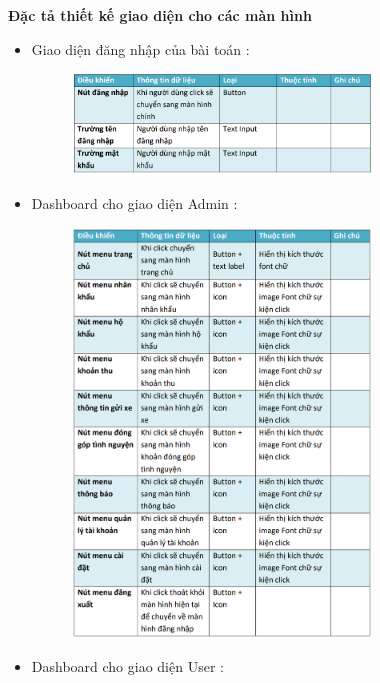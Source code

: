 \documentclass{article}
\begin{document}
\textbf{Đặc tả thiết kế giao diện cho các màn hình}
\begin{itemize}
    \item Giao diện đăng nhập của bài toán :
    \begin{figure}[H]
        \centering
        \includegraphics[width=0.75\textwidth]{Ảnh chương 4/Đăng nhập.png}
    \end{figure}
    \item Dashboard cho giao diện Admin :
    \begin{figure}[H]
        \centering
        \includegraphics[width=0.75\textwidth]{Ảnh chương 4/Dashboard.png}
    \end{figure}
    \item Dashboard cho giao diện User :
    \begin{figure}[H]
        \centering

\end{figure}
\end{itemize}
\end{document}
